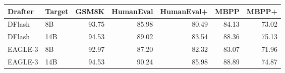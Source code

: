 \begin{tabular}{llrrrrr}
\toprule
Drafter & Target & GSM8K & HumanEval & HumanEval+ & MBPP & MBPP+ \\
\midrule
DFlash & 8B & 93.75 & 85.98 & 80.49 & 84.13 & 73.02 \\
DFlash & 14B & 94.53 & 89.02 & 83.54 & 88.36 & 75.13 \\
EAGLE-3 & 8B & 92.97 & 87.20 & 82.32 & 83.07 & 71.96 \\
EAGLE-3 & 14B & 94.53 & 90.24 & 85.98 & 88.89 & 74.87 \\
\bottomrule
\end{tabular}
